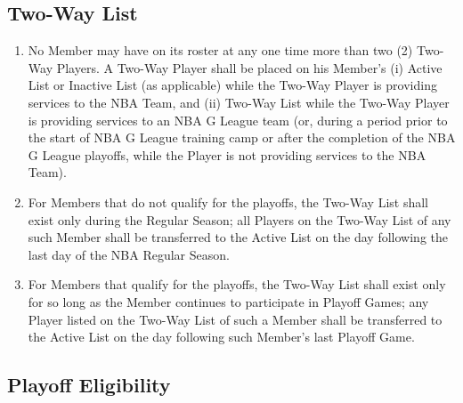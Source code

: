 \documentclass[]{book}
\providecommand{\tightlist}{%
  \setlength{\itemsep}{0pt}\setlength{\parskip}{0pt}}
\begin{document}
\hypertarget{two-way-list}{%
\subsection{Two-Way List}\label{two-way-list}}

\begin{enumerate}
\def\labelenumi{(\alph{enumi})}
\tightlist
\item
  No Member may have on its roster at any one time more than two (2) Two-Way Players. A Two-Way Player shall be placed on his Member's (i) Active List or Inactive List (as applicable) while the Two-Way Player is providing services to the NBA Team, and (ii) Two-Way List while the Two-Way Player is providing services to an NBA G League team (or, during a period prior to the start of NBA G League training camp or after the completion of the NBA G League playoffs, while the Player is not providing services to the NBA Team).
\item
  For Members that do not qualify for the playoffs, the Two-Way List shall exist only during the Regular Season; all Players on the Two-Way List of any such Member shall be transferred to the Active List on the day following the last day of the NBA Regular Season.
\item
  For Members that qualify for the playoffs, the Two-Way List shall exist only for so long as the Member continues to participate in Playoff Games; any Player listed on the Two-Way List of such a Member shall be transferred to the Active List on the day following such Member's last Playoff Game.
\end{enumerate}

\hypertarget{playoff-eligibility}{%
\subsection{Playoff Eligibility}\label{playoff-eligibility}}
\end{document}

